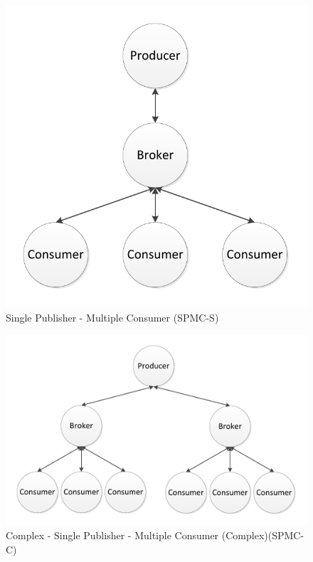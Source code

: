 \documentclass{thesis}
\begin{document}
\begin{figure}
\centering
\vspace{2.0in} 
\includegraphics{simple_fanout}  
\caption{Single Publisher - Multiple Consumer (SPMC-S)}
\label{Figure 3}  
\end{figure}

\begin{figure}
\centering
\vspace{2.0in} 
\includegraphics{complicated_fanout}  
\caption{Complex - Single Publisher - Multiple Consumer (Complex)(SPMC-C)}
\label{Figure 4}  
\end{figure}
\end{document}
